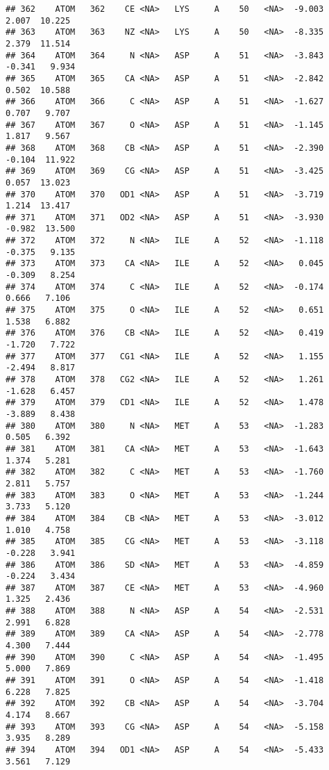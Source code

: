 \documentclass[
]{article}
\begin{document}
\begin{verbatim}
## 362    ATOM   362    CE <NA>   LYS     A    50   <NA>  -9.003   2.007  10.225
## 363    ATOM   363    NZ <NA>   LYS     A    50   <NA>  -8.335   2.379  11.514
## 364    ATOM   364     N <NA>   ASP     A    51   <NA>  -3.843  -0.341   9.934
## 365    ATOM   365    CA <NA>   ASP     A    51   <NA>  -2.842   0.502  10.588
## 366    ATOM   366     C <NA>   ASP     A    51   <NA>  -1.627   0.707   9.707
## 367    ATOM   367     O <NA>   ASP     A    51   <NA>  -1.145   1.817   9.567
## 368    ATOM   368    CB <NA>   ASP     A    51   <NA>  -2.390  -0.104  11.922
## 369    ATOM   369    CG <NA>   ASP     A    51   <NA>  -3.425   0.057  13.023
## 370    ATOM   370   OD1 <NA>   ASP     A    51   <NA>  -3.719   1.214  13.417
## 371    ATOM   371   OD2 <NA>   ASP     A    51   <NA>  -3.930  -0.982  13.500
## 372    ATOM   372     N <NA>   ILE     A    52   <NA>  -1.118  -0.375   9.135
## 373    ATOM   373    CA <NA>   ILE     A    52   <NA>   0.045  -0.309   8.254
## 374    ATOM   374     C <NA>   ILE     A    52   <NA>  -0.174   0.666   7.106
## 375    ATOM   375     O <NA>   ILE     A    52   <NA>   0.651   1.538   6.882
## 376    ATOM   376    CB <NA>   ILE     A    52   <NA>   0.419  -1.720   7.722
## 377    ATOM   377   CG1 <NA>   ILE     A    52   <NA>   1.155  -2.494   8.817
## 378    ATOM   378   CG2 <NA>   ILE     A    52   <NA>   1.261  -1.628   6.457
## 379    ATOM   379   CD1 <NA>   ILE     A    52   <NA>   1.478  -3.889   8.438
## 380    ATOM   380     N <NA>   MET     A    53   <NA>  -1.283   0.505   6.392
## 381    ATOM   381    CA <NA>   MET     A    53   <NA>  -1.643   1.374   5.281
## 382    ATOM   382     C <NA>   MET     A    53   <NA>  -1.760   2.811   5.757
## 383    ATOM   383     O <NA>   MET     A    53   <NA>  -1.244   3.733   5.120
## 384    ATOM   384    CB <NA>   MET     A    53   <NA>  -3.012   1.010   4.758
## 385    ATOM   385    CG <NA>   MET     A    53   <NA>  -3.118  -0.228   3.941
## 386    ATOM   386    SD <NA>   MET     A    53   <NA>  -4.859  -0.224   3.434
## 387    ATOM   387    CE <NA>   MET     A    53   <NA>  -4.960   1.325   2.436
## 388    ATOM   388     N <NA>   ASP     A    54   <NA>  -2.531   2.991   6.828
## 389    ATOM   389    CA <NA>   ASP     A    54   <NA>  -2.778   4.300   7.444
## 390    ATOM   390     C <NA>   ASP     A    54   <NA>  -1.495   5.000   7.869
## 391    ATOM   391     O <NA>   ASP     A    54   <NA>  -1.418   6.228   7.825
## 392    ATOM   392    CB <NA>   ASP     A    54   <NA>  -3.704   4.174   8.667
## 393    ATOM   393    CG <NA>   ASP     A    54   <NA>  -5.158   3.935   8.289
## 394    ATOM   394   OD1 <NA>   ASP     A    54   <NA>  -5.433   3.561   7.129

\end{verbatim}
\end{document}
